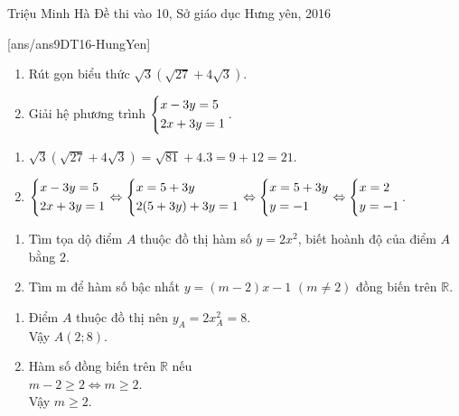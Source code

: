 \begin{name}
{Triệu Minh Hà}
{Đề thi vào 10, Sở giáo dục Hưng yên, 2016}
\end{name}
\setcounter{ex}{0}
[ans/ans9DT16-HungYen]
\begin{ex}%
 \begin{enumerate}
 	\item Rút gọn biểu thức  $\sqrt{3}(\sqrt{27}+4\sqrt{3}) $.
 	\item Giải hệ phương trình  $\left\{\begin{aligned}&x-3y=5\\&2x+3y=1\end{aligned}\right..$
 \end{enumerate}
\loigiai
   {\begin{enumerate}
   		\item $\sqrt{3}(\sqrt{27}+4\sqrt{3})=\sqrt{81}+4.3=9+12=21 $.
   		\item $\left\{\begin{aligned}&x-3y=5\\&2x+3y=1\end{aligned}\right.\Leftrightarrow\left\{\begin{aligned}&x=5+3y\\&2(5+3y)+3y=1\end{aligned}\right.\Leftrightarrow\left\{\begin{aligned}&x=5+3y\\&y=-1\end{aligned}\right.\Leftrightarrow \left\{\begin{aligned}&x=2\\&y=-1\end{aligned}\right.$.
   	\end{enumerate}
   
} 
\end{ex}
\begin{ex}%
	\begin{enumerate}
		\item Tìm tọa dộ điểm $A$ thuộc đồ thị hàm số $y = 2x^2$, biết hoành độ của điểm $A$ bằng $2$.
		\item Tìm m để hàm số bậc nhất $y= (m-2)x-1$ $(m\neq 2)$ đồng biến trên $\mathbb{R}$.
	\end{enumerate}
	\loigiai
	{\begin{enumerate}
			\item Điểm $A$ thuộc đồ thị nên $y_A=2x_A^2=8$. \\
			Vậy $A(2;8)$.
			\item Hàm số đồng biến trên $\mathbb{R}$ nếu\\
			$m-2\geq 2\Leftrightarrow m\geq 2$.\\
			Vậy $m\geq 2$.
		\end{enumerate}
		
	} 
\end{ex}
